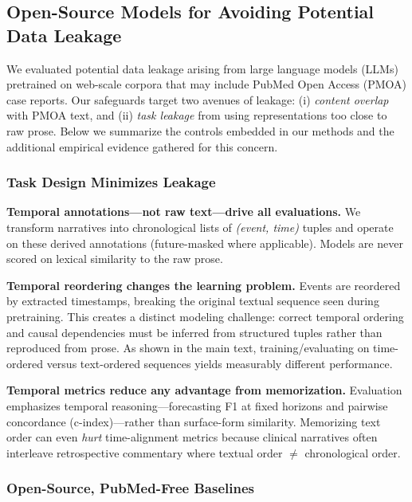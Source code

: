 \subsection{Open-Source Models for Avoiding Potential Data Leakage}
\label{ch07:apd:open_source}

We evaluated potential data leakage arising from large language models (LLMs) pretrained on web-scale corpora that may include PubMed Open Access (PMOA) case reports.
Our safeguards target two avenues of leakage: (i) \emph{content overlap} with PMOA text, and (ii) \emph{task leakage} from using representations too close to raw prose.
Below we summarize the controls embedded in our methods and the additional empirical evidence gathered for this concern.

\subsubsection{Task Design Minimizes Leakage}

\textbf{Temporal annotations—not raw text—drive all evaluations.}
We transform narratives into chronological lists of \emph{(event, time)} tuples and operate on these derived annotations (future-masked where applicable).
Models are never scored on lexical similarity to the raw prose.

\textbf{Temporal reordering changes the learning problem.}
Events are reordered by extracted timestamps, breaking the original textual sequence seen during pretraining.
This creates a distinct modeling challenge: correct temporal ordering and causal dependencies must be inferred from structured tuples rather than reproduced from prose.
As shown in the main text, training/evaluating on time-ordered versus text-ordered sequences yields measurably different performance.

\textbf{Temporal metrics reduce any advantage from memorization.}
Evaluation emphasizes temporal reasoning—forecasting F1 at fixed horizons and pairwise concordance (c-index)—rather than surface-form similarity.
Memorizing text order can even \emph{hurt} time-alignment metrics because clinical narratives often interleave retrospective commentary where textual order $\neq$ chronological order.

\subsubsection{Open-Source, PubMed-Free Baselines}

